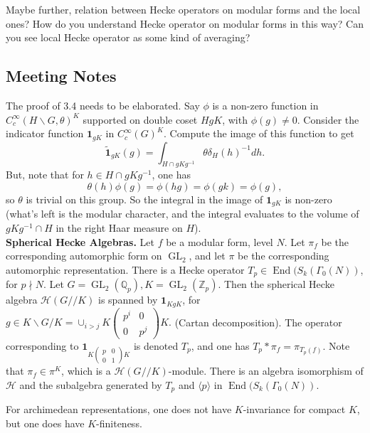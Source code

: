 \documentclass{amsart}
\numberwithin{equation}{section}
\theoremstyle{plain}
\theoremstyle{definition}
\theoremstyle{remark}
\newcommand{\Z}{\mathbb{Z}}
\newcommand{\Q}{\mathbb{Q}}
\renewcommand{\_}[2]{\underbrace{#1}_{#2}}
\renewcommand{\^}[2]{\overbrace{#1}_{#2}}
\renewcommand{\H}{\mathcal{H}}
\newcommand{\End}{\operatorname{End}}
\newcommand{\GL}{\operatorname{GL}}
\begin{document}
Maybe further, relation between Hecke operators on modular forms and the local ones? How do you understand Hecke operator on modular forms in this way? Can you see local Hecke operator as some kind of averaging?\\

\subsection{Meeting Notes}

The proof of 3.4 needs to be elaborated. Say $\phi$ is a non-zero function in $C_c^\infty(H\backslash G, \theta)^K$ supported on double coset $HgK$, with $\phi(g) \neq 0$. Consider the indicator function $\mathbf 1_{gK}$ in $C_c^\infty(G)^K$. Compute the image of this function to get \[\tilde{\mathbf 1}_{gK}(g) = \int_{H\cap gKg^{-1}} \theta \delta_H(h)^{-1} dh.\]
  But, note that for $h \in H \cap gKg^{-1}$, one has \[\theta(h)\phi(g) = \phi(hg) = \phi(gk) = \phi(g),\] so $\theta$ is trivial on this group. So the integral in the image of $\mathbf 1_{gK}$ is non-zero (what's left is the modular character, and the integral evaluates to the volume of $gKg^{-1}\cap H$ in the right Haar measure on $H$).\\

  
\textbf{Spherical Hecke Algebras.} Let $f$ be a modular form, level $N$. Let $\pi_f$ be the corresponding automorphic form on $\GL_2$, and let $\pi$ be the corresponding automorphic representation. There is a Hecke operator $T_p \in \End (S_k(\Gamma_0(N))$, for $p\nmid N$. Let $G = \GL_2(\Q_p), K = \GL_2(\Z_p)$. Then the spherical Hecke algebra $\H(G//K)$ is spanned by $\mathbf 1_{KgK}$, for $g \in K\backslash G/K = \cup_{i>j} K\begin{pmatrix}
    p^i & 0 \\ 0 & p^j
\end{pmatrix} K.$ (Cartan decomposition).
The operator corresponding to $\mathbf 1_{K\left(\begin{smallmatrix}p&0\\0&1\end{smallmatrix}\right)K}$ is denoted $T_p$, and one has $T_p *\pi_f = \pi_{T_p(f)}$. Note that $\pi_f \in \pi^K$, which is a $\H(G//K)$-module. There is an algebra isomorphism of $\H$ and the subalgebra generated by $T_p$ and $\langle p \rangle$ in $\End(S_k(\Gamma_0(N))$.

For archimedean representations, one does not have $K$-invariance for compact $K$, but one does have $K$-finiteness.\\
\end{document}
